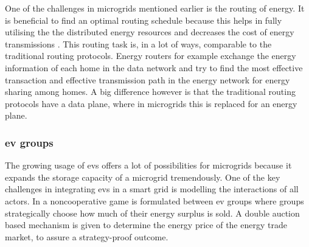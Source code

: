 One of the challenges in microgrids mentioned earlier is the routing of energy. It is beneficial to find an optimal routing schedule because this helps in fully utilising the the distributed energy resources and decreases the cost of energy transmissions \cite{HongKim2016}. This routing task is, in a lot of ways, comparable to the traditional routing protocols. Energy routers for example exchange the energy information of each home in the data network and try to find the most effective transaction and effective transmission path in the energy network for energy sharing among homes. \cite{YoonKimChang2013} A big difference however is that the traditional routing protocols have a data plane, where in microgrids this is replaced for an energy plane.

\subsubsection{\ac{ev} groups}
The growing usage of \ac{ev}s offers a lot of possibilities for microgrids because it expands the storage capacity of a microgrid tremendously. One of the key challenges in integrating \ac{ev}s in a smart grid is modelling the interactions of all actors. In \cite{SaadHanPoorEtAl2011} a noncooperative game is formulated between \ac{ev} groups where groups strategically choose how much of their energy surplus is sold. A double auction based mechanism is given to determine the energy price of the energy trade market, to assure a strategy-proof outcome. 